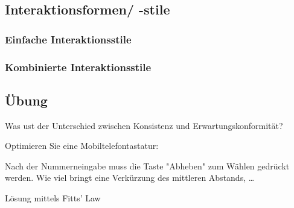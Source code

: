 \documentclass[a4paper]{article}
\begin{document}
\subsection{Interaktionsformen/ -stile}

\subsubsection{Einfache Interaktionsstile}

\subsubsection{Kombinierte Interaktionsstile}

\subsection{Übung}

Was ust der Unterschied zwischen Konsistenz und Erwartungskonformität?

Optimieren Sie eine Mobiltelefontastatur:

Nach der Nummerneingabe muss die Taste "Abheben" zum Wählen gedrückt werden. Wie viel bringt eine Verkürzung des mittleren Abstands, \dots

Lösung mittels Fitts' Law


\end{document}
